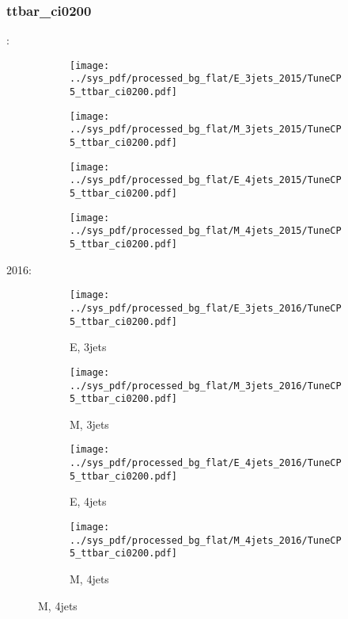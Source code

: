 \documentclass{beamer}
\begin{document}
\begin{frame}
\frametitle{ttbar_ci0200}
\fontsize{5}{1}:
\begin{figure}
\centering
\begin{subfigure}[b]{0.24\textwidth}
\texttt{[image: ../sys\_pdf/processed\_bg\_flat/E\_3jets\_2015/TuneCP5\_ttbar\_ci0200.pdf]}
\end{subfigure}
\begin{subfigure}[b]{0.24\textwidth}
\texttt{[image: ../sys\_pdf/processed\_bg\_flat/M\_3jets\_2015/TuneCP5\_ttbar\_ci0200.pdf]}
\end{subfigure}
\begin{subfigure}[b]{0.24\textwidth}
\texttt{[image: ../sys\_pdf/processed\_bg\_flat/E\_4jets\_2015/TuneCP5\_ttbar\_ci0200.pdf]}
\end{subfigure}
\begin{subfigure}[b]{0.24\textwidth}
\texttt{[image: ../sys\_pdf/processed\_bg\_flat/M\_4jets\_2015/TuneCP5\_ttbar\_ci0200.pdf]}
\end{subfigure}
\end{figure}
2016:
\begin{figure}
\centering
\begin{subfigure}[b]{0.24\textwidth}
\texttt{[image: ../sys\_pdf/processed\_bg\_flat/E\_3jets\_2016/TuneCP5\_ttbar\_ci0200.pdf]}
\captionsetup{font=tiny}
\caption{E, 3jets}
\end{subfigure}
\begin{subfigure}[b]{0.24\textwidth}
\texttt{[image: ../sys\_pdf/processed\_bg\_flat/M\_3jets\_2016/TuneCP5\_ttbar\_ci0200.pdf]}
\captionsetup{font=tiny}
\caption{M, 3jets}
\end{subfigure}
\begin{subfigure}[b]{0.24\textwidth}
\texttt{[image: ../sys\_pdf/processed\_bg\_flat/E\_4jets\_2016/TuneCP5\_ttbar\_ci0200.pdf]}
\captionsetup{font=tiny}
\caption{E, 4jets}
\end{subfigure}
\begin{subfigure}[b]{0.24\textwidth}
\texttt{[image: ../sys\_pdf/processed\_bg\_flat/M\_4jets\_2016/TuneCP5\_ttbar\_ci0200.pdf]}
\captionsetup{font=tiny}
\caption{M, 4jets}
\end{subfigure}
\end{figure}
\end{frame}
\end{document}
